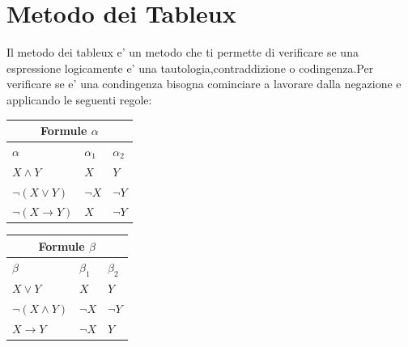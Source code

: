 \documentclass{article}
\begin{document}
    \section{Metodo dei Tableux}
    \begin{flushleft}
        Il metodo dei tableux e' un metodo che ti permette di verificare se una espressione logicamente
        e' una tautologia,contraddizione o codingenza.Per verificare se e' una condingenza bisogna cominciare
        a lavorare dalla negazione e applicando le seguenti regole:\\
        \begin{tabular} {|p{3cm}||p{3cm}||p{3cm}|}
           \hline
            \multicolumn{3}{|c|}{Formule $\alpha$}\\
           \hline
            $\alpha$& $\alpha_1$& $\alpha_2$ \\
            \hline
            $ X \land Y$& $ X$ & $ Y$ \\
            $\neg(X \lor Y)$& $\neg X$& $\neg Y$ \\
            $\neg(X \to Y)$& $ X$& $\neg Y$ \\
            \hline
        \end{tabular}
        \begin{tabular}{|p{3cm}||p{3cm}||p{3cm}|}
           \hline
            \multicolumn{3}{|c|}{Formule $\beta$}\\
           \hline
            $\beta$& $\beta_1$& $\beta_2$ \\
            \hline
            $ X \lor Y$& $ X$ & $ Y$ \\
            $\neg(X \land Y)$& $\neg X$& $\neg Y$ \\
            $X \to Y$& $ \neg X$& $Y$ \\
            \hline
        \end{tabular}
    \end{flushleft}
\end{document}
